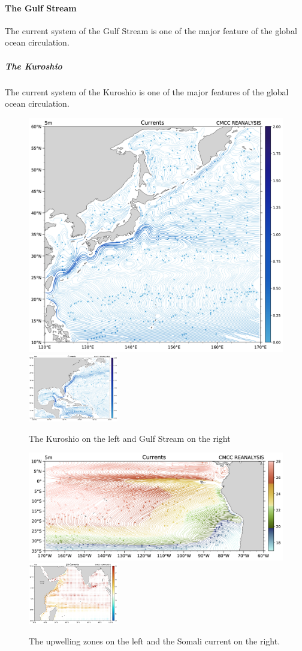 \paragraph{The Gulf Stream}\label{the-gulf-stream}

The current system of the Gulf Stream is one of the major feature of the
global ocean circulation.


\subparagraph{The Kuroshio}\label{the-kuroshio}

The current system of the Kuroshio is one of the major features of the
global ocean circulation.


\begin{figure}[htpb!]
	\centering
	\includegraphics[width = 0.30 \textwidth]{upload/44.png}\quad \includegraphics[width = 0.35\textwidth]{upload/43.png}
	\caption{The Kuroshio on the left and Gulf Stream on the right} \label{fig:}
\end{figure}

\begin{figure}[htpb!]
	\centering
	\includegraphics[width = 0.45 \textwidth]{upload/45.png}\quad \includegraphics[width = 0.35\textwidth]{upload/46.png}
	\caption{The upwelling zones on the left and the Somali current on the right.} \label{fig:upwelzone}
\end{figure}





